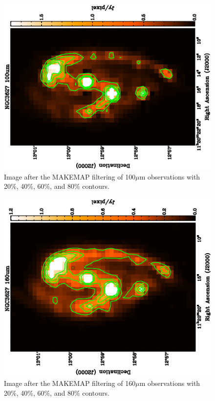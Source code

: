 \begin{figure}
  \centering
  \includegraphics[width=1.\textwidth,angle=270]{obs_imgs/100_rem.eps}
  \caption[NGC3627 100$\mu$m Observations]{Image after the MAKEMAP filtering of 100$\mu$m observations with 20\%, 40\%, 60\%, and 80\% contours.}
  \label{fig_100}
\end{figure}

\begin{figure}
  \centering
  \includegraphics[width=1.\textwidth,angle=270]{obs_imgs/160_rem.eps}
  \caption[NGC3627 160$\mu$m Observations]{Image after the MAKEMAP filtering of 160$\mu$m observations with 20\%, 40\%, 60\%, and 80\% contours.}
  \label{fig_160}
\end{figure}

